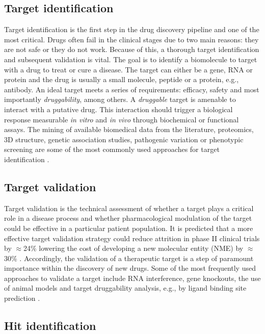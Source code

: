 \vspace{-13pt} %

\subsection{Target identification}

Target identification is the first step in the drug discovery pipeline and one of the most critical. Drugs often fail in the clinical stages due to two main reasons: they are not safe or they do not work. Because of this, a thorough target identification and subsequent validation is vital. The goal is to identify a biomolecule to target with a drug to treat or cure a disease. The target can either be a gene, RNA or protein and the drug is usually a small molecule, peptide or a protein, e.g., antibody. An ideal target meets a series of requirements: efficacy, safety and most importantly \textit{druggability}, among others. A \textit{druggable} target is amenable to interact with a putative drug. This interaction should trigger a biological response measurable \textit{in vitro} and \textit{in vivo} through biochemical or functional assays. The mining of available biomedical data from the literature, proteomics, 3D structure, genetic association studies, pathogenic variation or phenotypic screening are some of the most commonly used approaches for target identification \cite{SCHENONE_2013_TARGETID}.

\subsection{Target validation}

Target validation is the technical assessment of whether a target plays a critical role in a disease process and whether pharmacological modulation of the target could be effective in a particular patient population. It is predicted that a more effective target validation strategy could reduce attrition in phase II clinical trials by $\approx$24\% lowering the cost of developing a new molecular entity (NME) by $\approx$30\% \cite{PAUL_2010_RD}. Accordingly, the validation of a therapeutic target is a step of paramount importance within the discovery of new drugs. Some of the most frequently used approaches to validate a target include RNA interference, gene knockouts, the use of animal models and target druggability analysis, e.g., by ligand binding site prediction \cite{EMMERICH_2021_TARGET_VAL}.

\subsection{Hit identification}

